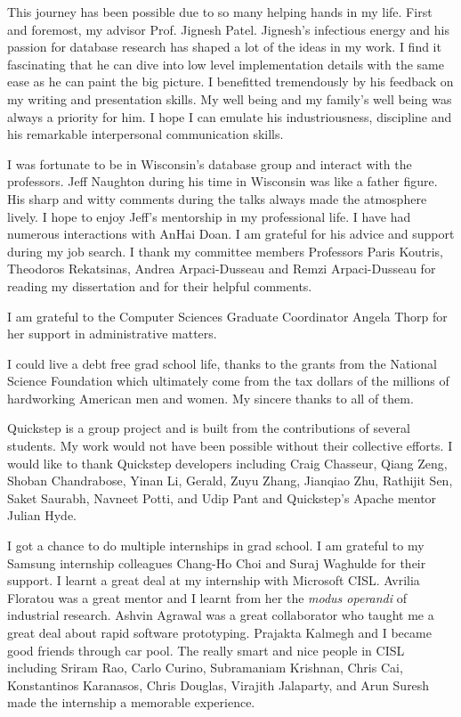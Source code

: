 This journey has been possible due to so many helping hands in my life. 
First and foremost, my advisor Prof. Jignesh Patel. 
Jignesh's infectious energy and his passion for database research has shaped a lot of the ideas in my work.
I find it fascinating that he can dive into low level implementation details with the same ease as he can paint the big picture.
I benefitted tremendously by his feedback on my writing and presentation skills. 
My well being and my family's well being was always a priority for him. 
I hope I can emulate his industriousness, discipline and his remarkable interpersonal communication skills. 

I was fortunate to be in Wisconsin's database group and interact with the professors. 
Jeff Naughton during his time in Wisconsin was like a father figure. 
His sharp and witty comments during the talks always made the atmosphere lively. 
I hope to enjoy Jeff's mentorship in my professional life. 
I have had numerous interactions with AnHai Doan.
I am grateful for his advice and support during my job search.
I thank my committee members Professors Paris Koutris, Theodoros Rekatsinas, Andrea Arpaci-Dusseau and Remzi Arpaci-Dusseau for reading my dissertation and for their helpful comments. 

I am grateful to the Computer Sciences Graduate Coordinator Angela Thorp for her support in administrative matters. 

I could live a debt free grad school life, thanks to the grants from the National Science Foundation which  ultimately come from the tax dollars of the millions of hardworking American men and women. 
My sincere thanks to all of them.

Quickstep is a group project and is built from the contributions of several students.
My work would not have been possible without their collective efforts. 
I would like to thank Quickstep developers including Craig Chasseur, Qiang Zeng, Shoban Chandrabose, Yinan Li, Gerald, Zuyu Zhang, Jianqiao Zhu, Rathijit Sen, Saket Saurabh, Navneet Potti, and Udip Pant and Quickstep's Apache mentor Julian Hyde.  

I got a chance to do multiple internships in grad school. 
I am grateful to my Samsung internship colleagues Chang-Ho Choi and Suraj Waghulde for their support. 
I learnt a great deal at my internship with Microsoft CISL.
Avrilia Floratou was a great mentor and I learnt from her the \textit{modus operandi} of industrial research.
Ashvin Agrawal was a great collaborator who taught me a great deal about rapid software prototyping. 
Prajakta Kalmegh and I became good friends through car pool. 
The really smart and nice people in CISL including Sriram Rao, Carlo Curino, Subramaniam Krishnan, Chris Cai, Konstantinos Karanasos, Chris Douglas, Virajith Jalaparty, and Arun Suresh made the internship a memorable experience. 

